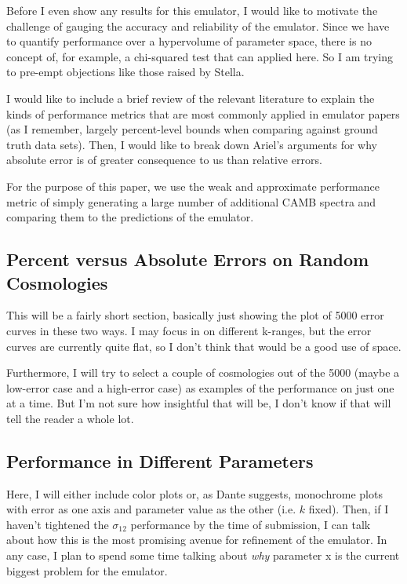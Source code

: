 \documentclass[11pt]{article}
\begin{document}
Before I even show any results for this emulator, I would like to motivate the challenge of gauging the accuracy and reliability of the emulator. Since we have to quantify performance over a hypervolume of parameter space, there is no concept of, for example, a chi-squared test that can applied here. So I am trying to pre-empt objections like those raised by Stella.

I would like to include a brief review of the relevant literature to explain the kinds of performance metrics that are most commonly applied in emulator papers (as I remember, largely percent-level bounds when comparing against ground truth data sets). Then, I would like to break down Ariel's arguments for why absolute error is of greater consequence to us than relative errors.

For the purpose of this paper, we use the weak and approximate performance metric of simply generating a large number of additional CAMB spectra and comparing them to the predictions of the emulator.

\begin{centering}
\subsection{Percent versus Absolute Errors on Random Cosmologies}
\end{centering}

This will be a fairly short section, basically just showing the plot of 5000 error curves in these two ways. I may focus in on different k-ranges, but the error curves are currently quite flat, so I don't think that would be a good use of space.

Furthermore, I will try to select a couple of cosmologies out of the 5000 (maybe a low-error case and a high-error case) as examples of the performance on just one at a time. But I'm not sure how insightful that will be, I don't know if that will tell the reader a whole lot.

\begin{centering}
\subsection{Performance in Different Parameters}
\end{centering}

Here, I will either include color plots or, as Dante suggests, monochrome plots with error as one axis and parameter value as the other (i.e. $k$ fixed). Then, if I haven't tightened the $\sigma_{12}$ performance by the time of submission, I can talk about how this is the most promising avenue for refinement of the emulator. In any case, I plan to spend some time talking about \textit{why} parameter x is the current biggest problem for the emulator. 
\end{document}

